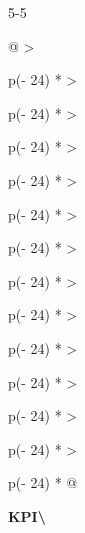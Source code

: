 \begin{wptable}{5-5}\footnotesize

\begin{longtable}[]{@{}
  >{\raggedright\arraybackslash}p{(\columnwidth - 24\tabcolsep) * }
  >{\raggedright\arraybackslash}p{(\columnwidth - 24\tabcolsep) * }
  >{\raggedright\arraybackslash}p{(\columnwidth - 24\tabcolsep) * }
  >{\raggedright\arraybackslash}p{(\columnwidth - 24\tabcolsep) * }
  >{\raggedright\arraybackslash}p{(\columnwidth - 24\tabcolsep) * }
  >{\raggedright\arraybackslash}p{(\columnwidth - 24\tabcolsep) * }
  >{\raggedright\arraybackslash}p{(\columnwidth - 24\tabcolsep) * }
  >{\raggedright\arraybackslash}p{(\columnwidth - 24\tabcolsep) * }
  >{\raggedright\arraybackslash}p{(\columnwidth - 24\tabcolsep) * }
  >{\raggedright\arraybackslash}p{(\columnwidth - 24\tabcolsep) * }
  >{\raggedright\arraybackslash}p{(\columnwidth - 24\tabcolsep) * }
  >{\raggedright\arraybackslash}p{(\columnwidth - 24\tabcolsep) * }
  >{\raggedright\arraybackslash}p{(\columnwidth - 24\tabcolsep) * }@{}}
\caption{Mapping of Analytics Engine requirements onto the project
KPIs}\tabularnewline
\toprule\noalign{}
\begin{minipage}[b]{\linewidth}\raggedright
\textbf{KPI\textbackslash{}}


\end{minipage}
\end{longtable}
\end{wptable}
